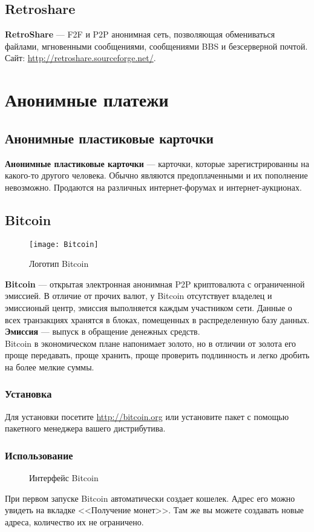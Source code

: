 \subsection{Retroshare}
\textbf{RetroShare} --- F2F и P2P анонимная сеть, позволяющая обмениваться файлами, мгновенными сообщениями, сообщениями BBS и безсерверной почтой. Сайт: \url{http://retroshare.sourceforge.net/}.

\section{Анонимные платежи}
\subsection{Анонимные пластиковые карточки}
\textbf{Анонимные пластиковые карточки} --- карточки, которые зарегистрированны на какого-то другого человека. Обычно являются предоплаченными и их пополнение невозможно. Продаются на различных интернет-форумах и интернет-аукционах.
\subsection{Bitcoin}
\begin{wrapfigure}[6]{r}{0.25\linewidth}
\texttt{[image: Bitcoin]}
\caption{Логотип Bitcoin}
\end{wrapfigure}
\textbf{Bitcoin} --- открытая электронная анонимная P2P криптовалюта с ограниченной эмиссией. В отличие от прочих валют, у Bitcoin отсутствует владелец и эмиссионый центр, эмиссия выполняется каждым участником сети. Данные о всех транзакциях хранятся в блоках, помещенных в распределенную базу данных.\\
\textbf{Эмиссия} --- выпуск в обращение денежных средств.\\
Bitcoin в экономическом плане напонимает золото, но в отличии от золота его проще передавать, проще хранить, проще проверить подлинность и легко дробить на более мелкие суммы.
\subsubsection{Установка}
Для установки посетите \url{http://bitcoin.org} или установите пакет с помощью пакетного менеджера вашего дистрибутива.
\subsubsection{Использование}
\begin{figure}[h]
\caption{Интерфейс Bitcoin}
\end{figure}
При первом запуске Bitcoin автоматически создает кошелек. Адрес его можно увидеть на вкладке <<Получение монет>>. Там же вы можете создавать новые адреса, количество их не ограничено.
